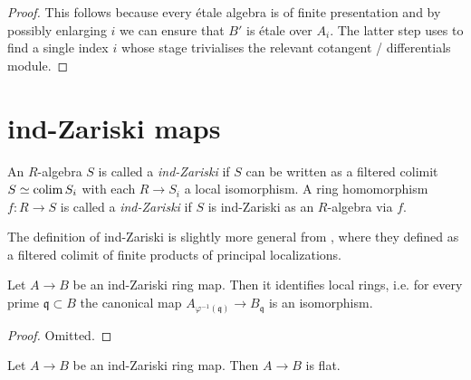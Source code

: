 \begin{proof}
    This follows because every étale algebra is of finite presentation and by possibly enlarging $i$ we can ensure
    that $B'$ is étale over $A_i$. The latter step uses
     to find a single index $i$ whose
    stage trivialises the relevant cotangent / differentials module.
\end{proof}

\section{ind-Zariski maps}

\begin{definition}
    \label{def:ind-Zariski}
    \leanok
    An $R$-algebra $S$ is called a \emph{ind-Zariski} if $S$ can be written as a filtered colimit $S \simeq \operatorname{colim} S_i$ with each $R \to S_i$ a local isomorphism. A ring homomorphism $f : R \to S$ is called a \emph{ind-Zariski} if $S$ is ind-Zariski as an $R$-algebra via $f$.
\end{definition}

\begin{remark}
  The definition of ind-Zariski is slightly more general from \cite[Definition 2.2.1(iv)]{proetale}, where they defined as a filtered colimit of finite products of principal localizations.
\end{remark}

\begin{lemma}
  Let $A \to B$ be an ind-Zariski ring map. Then it identifies local rings, i.e. for every prime 
  $\mathfrak{q} \subset B$ the canonical map $A_{\varphi^{-1}(\mathfrak{q})} \to B_{\mathfrak{q}}$
  is an isomorphism.
  \label{thm:ind-Zariski-identifies-local-rings}
  \leanok
\end{lemma}

\begin{proof}
  Omitted.
\end{proof}

\begin{lemma}
  Let $A \to B$ be an ind-Zariski ring map. Then $A \to B$ is flat.
  \label{thm:ind-Zariski-is-flat}
  \leanok
\end{lemma}

